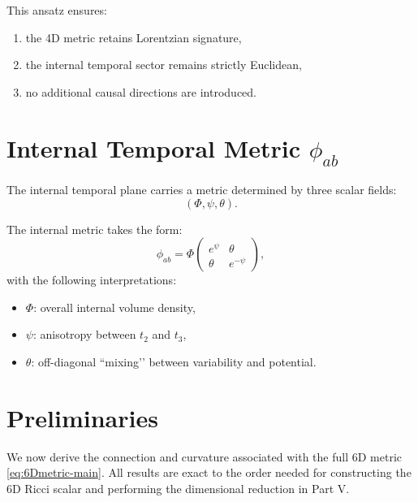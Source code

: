 \documentclass[12pt]{article}
\begin{document}
This ansatz ensures:
\begin{enumerate}
\item the 4D metric retains Lorentzian signature,
\item the internal temporal sector remains strictly Euclidean,
\item no additional causal directions are introduced.
\end{enumerate}


\newpage
\section{Internal Temporal Metric \texorpdfstring{$\phi_{ab}$}{phi\_ab}}

The internal temporal plane carries a metric determined by three scalar
fields:
\[
(\Phi, \psi, \theta).
\]

The internal metric takes the form:
\begin{equation}
\phi_{ab} = \Phi
\begin{pmatrix}
e^{\psi} & \theta \\
\theta   & e^{-\psi}
\end{pmatrix},
\label{eq:internalmetric-main}
\end{equation}
with the following interpretations:

\begin{itemize}
\item \(\Phi\): overall internal volume density,
\item \(\psi\): anisotropy between \(t_2\) and \(t_3\),
\item \(\theta\): off-diagonal ``mixing’’ between variability and potential.
\end{itemize}


\newpage
\section{Preliminaries}

We now derive the connection and curvature associated with the full 6D metric
\eqref{eq:6Dmetric-main}. All results are exact to the order needed for
constructing the 6D Ricci scalar and performing the dimensional reduction in
Part V.
\end{document}
